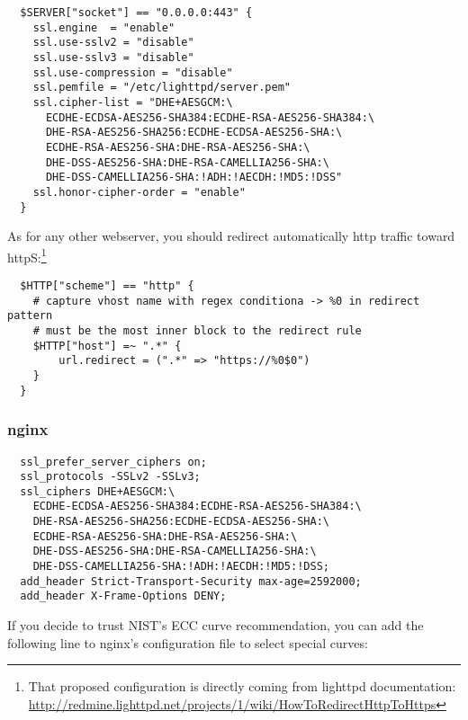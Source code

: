 \begin{verbatim}
  $SERVER["socket"] == "0.0.0.0:443" {
    ssl.engine  = "enable"
    ssl.use-sslv2 = "disable"
    ssl.use-sslv3 = "disable"
    ssl.use-compression = "disable"
    ssl.pemfile = "/etc/lighttpd/server.pem"
    ssl.cipher-list = "DHE+AESGCM:\
      ECDHE-ECDSA-AES256-SHA384:ECDHE-RSA-AES256-SHA384:\
      DHE-RSA-AES256-SHA256:ECDHE-ECDSA-AES256-SHA:\
      ECDHE-RSA-AES256-SHA:DHE-RSA-AES256-SHA:\
      DHE-DSS-AES256-SHA:DHE-RSA-CAMELLIA256-SHA:\
      DHE-DSS-CAMELLIA256-SHA:!ADH:!AECDH:!MD5:!DSS"
    ssl.honor-cipher-order = "enable"
  }
\end{verbatim}

As for any other webserver, you should redirect automatically http traffic toward httpS:\footnote{That proposed configuration is directly coming from lighttpd documentation: \url{http://redmine.lighttpd.net/projects/1/wiki/HowToRedirectHttpToHttps}}

\begin{verbatim}
  $HTTP["scheme"] == "http" {
    # capture vhost name with regex conditiona -> %0 in redirect pattern
    # must be the most inner block to the redirect rule
    $HTTP["host"] =~ ".*" {
        url.redirect = (".*" => "https://%0$0")
    }
  }
\end{verbatim}

\subsubsection{nginx}



\begin{verbatim}
  ssl_prefer_server_ciphers on;
  ssl_protocols -SSLv2 -SSLv3; 
  ssl_ciphers DHE+AESGCM:\
    ECDHE-ECDSA-AES256-SHA384:ECDHE-RSA-AES256-SHA384:\
    DHE-RSA-AES256-SHA256:ECDHE-ECDSA-AES256-SHA:\
    ECDHE-RSA-AES256-SHA:DHE-RSA-AES256-SHA:\
    DHE-DSS-AES256-SHA:DHE-RSA-CAMELLIA256-SHA:\
    DHE-DSS-CAMELLIA256-SHA:!ADH:!AECDH:!MD5:!DSS;
  add_header Strict-Transport-Security max-age=2592000;
  add_header X-Frame-Options DENY;
\end{verbatim}



If you decide to trust NIST's ECC curve recommendation, you can add the following line to nginx's configuration file to select special curves:

